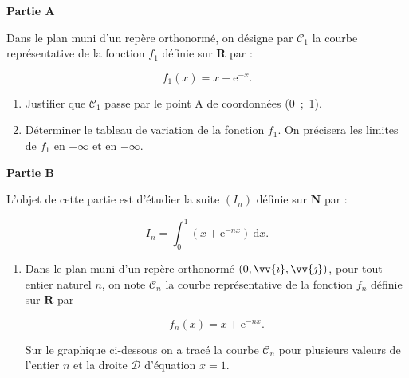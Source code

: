 \documentclass[12pt,a4paper,french]{article}
\newcommand{\Oij}{$(0,\vv{\imath},\vv{\jmath})$}
\newcommand{\R}{\mathbf{R}}
\newcommand{\N}{\mathbf{N}}
\theoremstyle{break}
\theoremstyle{plain}
\theoremstyle{nonumberplain}
\theoremstyle{nonumberbreak}
\begin{document}
\begin{question}
\textbf{Partie A} 

\medskip

Dans le plan muni d'un repère orthonormé, on désigne par  $\mathcal{C}_1$ la courbe représentative de la fonction $f_1$  définie sur $\R$ par : 

\[f_1(x) = x +  \text{e}^{-x}.\]


\begin{enumerate}
\item  Justifier que $\mathcal{C}_1$ passe par le point A de coordonnées (0~;~1). 
\item  Déterminer le tableau de variation de la fonction $f_1$. On précisera les limites de $f_1$ en $+ \infty$ et en $- \infty$. 
\end{enumerate}

\bigskip

\textbf{Partie B}

\medskip

L’objet de cette partie est d'étudier la suite $\left(I_n\right)$ définie sur $\N$ par : 

\[I_n = \int_0^1 \left(x + \text{e}^{- nx}\right)\:\text{d}x.\] 


\begin{enumerate}
\item  Dans le plan muni d'un repère orthonormé \Oij , pour tout entier naturel $n$, on note 
$\mathcal{C}_n$ la courbe représentative de la fonction $f_n $ définie sur $\R$ par 

\[f_n(x) = x + \text{e}^{- nx}. \]

Sur le graphique ci-dessous on a tracé la courbe  $\mathcal{C}_n$ pour plusieurs valeurs de l'entier $n$ et la droite $\mathcal{D}$ d'équation $x = 1$. 


\end{enumerate}
\end{question}
\end{document}

